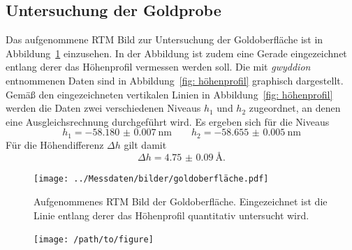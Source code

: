\subsection{Untersuchung der Goldprobe}
Das aufgenommene RTM Bild zur Untersuchung der Goldoberfläche ist in Abbildung~\ref{fig: au} einzusehen.
In der Abbildung ist zudem eine Gerade eingezeichnet entlang derer das Höhenprofil vermessen werden soll.
Die mit \emph{gwyddion} entnommenen Daten sind in Abbildung~\ref{fig: höhenprofil}
graphisch dargestellt. Gemäß den eingezeichneten vertikalen Linien
in Abbildung~\ref{fig: höhenprofil} werden die Daten zwei verschiedenen
Niveaus $h_1$ und $h_2$ zugeordnet, an denen eine Ausgleichsrechnung durchgeführt wird. Es ergeben sich für die
Niveaus
\begin{equation}
  h_1 = \SI{-58.180(7)}{\nano\meter} \qquad h_2 = \SI{-58.655(5)}{\nano\meter}
\end{equation}
Für die Höhendifferenz $\Delta h$ gilt damit
\begin{equation}
  \Delta h = \SI{4.75(9)}{\angstrom}.
\end{equation}
\begin{figure}
  \centering
  \texttt{[image: ../Messdaten/bilder/goldoberfläche.pdf]}
  \caption{Aufgenommenes RTM Bild der Goldoberfläche. Eingezeichnet ist die Linie entlang derer
  das Höhenprofil quantitativ untersucht wird.}
  \label{fig: au}
\end{figure}
\begin{figure}
  \centering
  \texttt{[image: /path/to/figure]}
  \caption{}
  \label{}
\end{figure}
